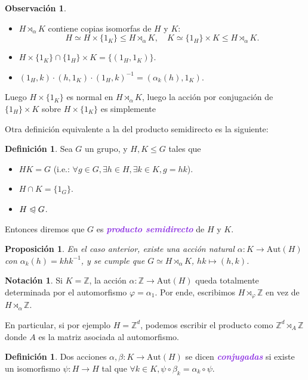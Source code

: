 \documentclass{article}
\newtheorem{proposition}[theorem]{Proposición}
\theoremstyle{definition}
\newtheorem{definition}[theorem]{Definición}
\newtheorem*{notation}{Notación}
\newtheorem*{obs}{Observación}
\theoremstyle{remark}
\numberwithin{equation}{section}
\newcommand{\Z}{\mathbb{Z}}
\renewcommand{\a}{\alpha}
\newcommand{\vphi}{\varphi}
\renewcommand{\c}{\cdot}
\newcommand{\normal}{\trianglelefteqslant}
\newcommand{\Aut}{\mathrm{Aut}}
\renewcommand{\o}{\to}
\newcommand{\wea}[1]{\textcolor{BlueViolet}{\textbf{\emph{#1}}}}
\begin{document}
\begin{obs}\
  \begin{itemize}
    \item $H \rtimes_\a K$ contiene copias isomorfas de $H$ y $K$:
    \[ H \simeq H \times \{1_K\} \leqslant H \rtimes_\a K, \quad
    K \simeq \{1_H\} \times K \leqslant H \rtimes_\a K.\]
    \item $H \times \{1_K\} \cap \{1_H\} \times K = \{(1_H,1_K)\}.$
    \item $(1_H,k) \c (h,1_K) \c (1_H,k)^{-1} = (\a_k(h),1_K)$.
  \end{itemize}
  Luego $H \times \{1_K\}$ es normal en $H \rtimes_\a K$, luego la acción por conjugación de $\{1_H\} \times K$ sobre $H \times \{1_K\}$ es simplemente 
\end{obs}

Otra definición equivalente a la del producto semidirecto es la siguiente:

\begin{definition}
  Sea $G$ un grupo, y $H,K \leqslant G$ tales que
  \begin{itemize}[(i)]
    \item $HK = G$ (i.e.: $\forall g \in G, \exists h \in H, \exists k \in K, g = hk$).
    \item $H \cap K = \{1_G\}$.
    \item $H \normal G$.
  \end{itemize}
  Entonces diremos que $G$ es \wea{producto semidirecto} de $H$ y $K$.
\end{definition}

\begin{proposition}
  En el caso anterior, existe una acción natural $\a \colon K \o \Aut(H)$ con $\a_k(h) = khk^{-1}$, y se cumple que $G \simeq H \rtimes_\a K$, $hk \mapsto (h,k)$.
\end{proposition}

\begin{notation}
  Si $K = \Z$, la acción $\a \colon \Z \to \Aut(H)$ queda totalmente determinada por el automorfismo $\vphi = \a_1$. Por ende, escribimos $H \rtimes_\vphi \Z$ en vez de $H \rtimes_\a \Z$.

  En particular, si por ejemplo $H = \Z^d$, podemos escribir el producto como $\Z^d \rtimes_A \Z$ donde $A$ es la matriz asociada al automorfismo.
\end{notation}

\begin{definition}
  Dos acciones $\a,\beta \colon K \to \Aut(H)$ se dicen \wea{conjugadas} si existe un isomorfismo $\psi \colon H \to H$ tal que $\forall k \in K, \psi \circ \beta_k = \a_k \circ \psi$.
\end{definition}
\end{document}
